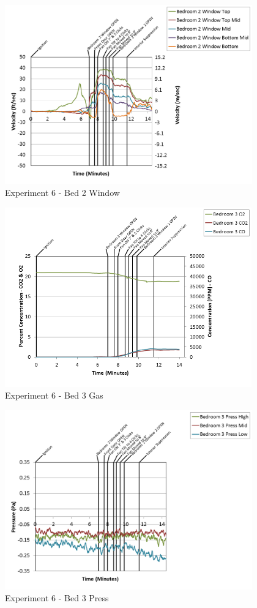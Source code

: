 \documentclass{article}
\begin{document}
\begin{appendices}
\begin{figure}[h!]
	\centering
	\includegraphics[height=3.05in]{0_Images/Results_Charts/Exp_6_Charts/Bed2Window.png}
	\caption{Experiment 6 - Bed 2 Window}
\end{figure}

\clearpage

\begin{figure}[h!]
	\centering
	\includegraphics[height=3.05in]{0_Images/Results_Charts/Exp_6_Charts/Bed3Gas.png}
	\caption{Experiment 6 - Bed 3 Gas}
\end{figure}


\begin{figure}[h!]
	\centering
	\includegraphics[height=3.05in]{0_Images/Results_Charts/Exp_6_Charts/Bed3Press.png}
	\caption{Experiment 6 - Bed 3 Press}
\end{figure}


\end{appendices}
\end{document}
